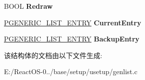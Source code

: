 \begin{DoxyCompactItemize}
B\+O\+OL {\bfseries Redraw}
\item 
\mbox{\label{struct___g_e_n_e_r_i_c___l_i_s_t_a251cbd0d6e4f62dc32a589dca56c4828}} 
\hyperlink{struct___g_e_n_e_r_i_c___l_i_s_t___e_n_t_r_y}{P\+G\+E\+N\+E\+R\+I\+C\+\_\+\+L\+I\+S\+T\+\_\+\+E\+N\+T\+RY} {\bfseries Current\+Entry}
\item 
\mbox{\label{struct___g_e_n_e_r_i_c___l_i_s_t_a5bcf91b72311ecaec2c14142a0a13bda}} 
\hyperlink{struct___g_e_n_e_r_i_c___l_i_s_t___e_n_t_r_y}{P\+G\+E\+N\+E\+R\+I\+C\+\_\+\+L\+I\+S\+T\+\_\+\+E\+N\+T\+RY} {\bfseries Backup\+Entry}
\end{DoxyCompactItemize}


该结构体的文档由以下文件生成\+:\begin{DoxyCompactItemize}
\item 
E\+:/\+React\+O\+S-\/0../base/setup/usetup/genlist.\+c\end{DoxyCompactItemize}
